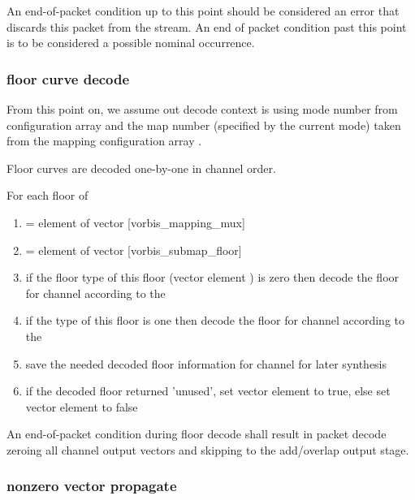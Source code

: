 An end-of-packet condition up to this point should be considered an
error that discards this packet from the stream.  An end of packet
condition past this point is to be considered a possible nominal
occurrence.



\subsubsection{floor curve decode}

From this point on, we assume out decode context is using mode number
 from configuration array
 and the map number
 (specified by the current mode) taken
from the mapping configuration array
.

Floor curves are decoded one-by-one in channel order.

For each floor \varname{[i]} of 
 \begin{enumerate}
  \item {} = element \varname{[i]} of vector [vorbis_mapping_mux]
  \item {} = element  of vector
[vorbis_submap_floor]
  \item if the floor type of this
floor (vector  element
) is zero then decode the floor for
channel \varname{[i]} according to the
  \item if the type of this floor
is one then decode the floor for channel \varname{[i]} according
to the 
  \item save the needed decoded floor information for channel for later synthesis
  \item if the decoded floor returned 'unused', set vector \varname{[no_residue]} element
\varname{[i]} to true, else set vector \varname{[no_residue]} element \varname{[i]} to
false
 \end{enumerate}


An end-of-packet condition during floor decode shall result in packet
decode zeroing all channel output vectors and skipping to the
add/overlap output stage.



\subsubsection{nonzero vector propagate}

